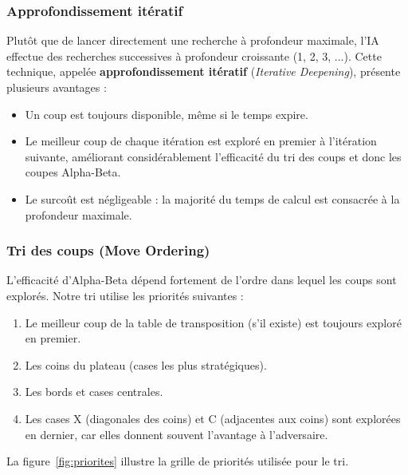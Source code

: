 \documentclass[12pt, a4paper]{article}
\begin{document}
\subsubsection{Approfondissement itératif}

Plutôt que de lancer directement une recherche à profondeur maximale, l'IA effectue des recherches successives à profondeur croissante (1, 2, 3, ...). Cette technique, appelée \textbf{approfondissement itératif} (\textit{Iterative Deepening}), présente plusieurs avantages :

\begin{itemize}
    \item Un coup est toujours disponible, même si le temps expire.
    \item Le meilleur coup de chaque itération est exploré en premier à l'itération suivante, améliorant considérablement l'efficacité du tri des coups et donc les coupes Alpha-Beta.
    \item Le surcoût est négligeable : la majorité du temps de calcul est consacrée à la profondeur maximale.
\end{itemize}

\subsubsection{Tri des coups (Move Ordering)}

L'efficacité d'Alpha-Beta dépend fortement de l'ordre dans lequel les coups sont explorés. Notre tri utilise les priorités suivantes :

\begin{enumerate}
    \item Le meilleur coup de la table de transposition (s'il existe) est toujours exploré en premier.
    \item Les coins du plateau (cases les plus stratégiques).
    \item Les bords et cases centrales.
    \item Les cases X (diagonales des coins) et C (adjacentes aux coins) sont explorées en dernier, car elles donnent souvent l'avantage à l'adversaire.
\end{enumerate}

La figure~\ref{fig:priorites} illustre la grille de priorités utilisée pour le tri.
\end{document}
